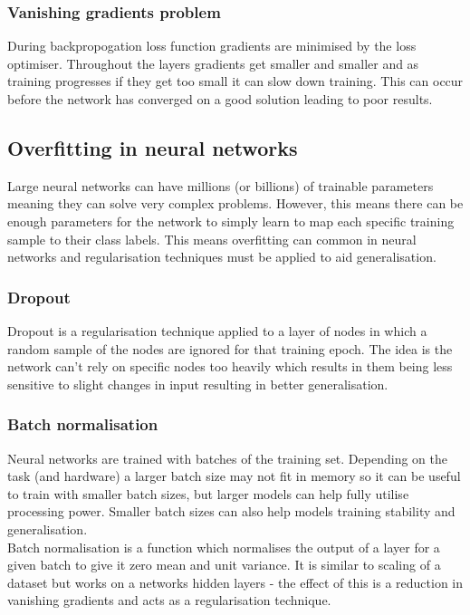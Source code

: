 \documentclass[
    author={Kai Hulme},
    supervisor={Dr Jon Bird},
    degree={BSc},
    title={Generative Adversarial Networks as an Augmentation Technique},
    subtitle={for Alzheimer's Disease Detection in MRI Volumes},
    type={Research},
    year={2021} 
]{dissertation}
\begin{document}
\subsubsection{Vanishing gradients problem}

During backpropogation loss function gradients are minimised by the loss optimiser. Throughout the layers gradients get smaller and smaller and as training progresses if they get too small it can slow down training. This can occur before the network has converged on a good solution leading to poor results.
	
\subsection{Overfitting in neural networks}

Large neural networks can have millions (or billions) of trainable parameters meaning they can solve very complex problems. However, this means there can be enough parameters for the network to simply learn to map each specific training sample to their class labels. This means overfitting can common in neural networks and regularisation techniques must be applied to aid generalisation.

\subsubsection{Dropout}

Dropout \cite{dropout2014} is a regularisation technique applied to a layer of nodes in which a random sample of the nodes are ignored for that training epoch. The idea is the network can't rely on specific nodes too heavily which results in them being less sensitive to slight changes in input resulting in better generalisation. 

\subsubsection{Batch normalisation}

Neural networks are trained with batches of the training set. Depending on the task (and hardware) a larger batch size may not fit in memory so it can be useful to train with smaller batch sizes, but larger models can help fully utilise processing power. Smaller batch sizes can also help models training stability and generalisation. \\

Batch normalisation is a function which normalises the output of a layer for a given batch to give it zero mean and unit variance. It is similar to scaling of a dataset but works on a networks hidden layers - the effect of this is a reduction in vanishing gradients and acts as a regularisation technique.
	
\end{document}
